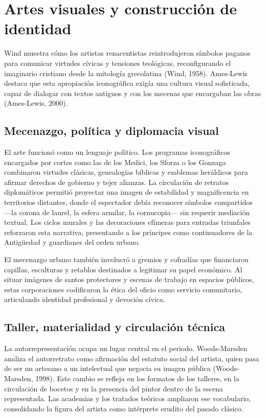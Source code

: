 \chapter{Artes visuales y construcción de identidad}
Wind muestra cómo los artistas renacentistas reintrodujeron símbolos paganos para comunicar virtudes cívicas y tensiones teológicas, reconfigurando el imaginario cristiano desde la mitología grecolatina (Wind, 1958). Ames-Lewis destaca que esta apropiación iconográfica exigía una cultura visual sofisticada, capaz de dialogar con textos antiguos y con los mecenas que encargaban las obras (Ames-Lewis, 2000).

\section{Mecenazgo, política y diplomacia visual}
El arte funcionó como un lenguaje político. Los programas iconográficos encargados por cortes como las de los Medici, los Sforza o los Gonzaga combinaron virtudes clásicas, genealogías bíblicas y emblemas heráldicos para afirmar derechos de gobierno y tejer alianzas. La circulación de retratos diplomáticos permitió proyectar una imagen de estabilidad y magnificencia en territorios distantes, donde el espectador debía reconocer símbolos compartidos —la corona de laurel, la esfera armilar, la cornucopia— sin requerir mediación textual. Los ciclos murales y las decoraciones efímeras para entradas triunfales reforzaron esta narrativa, presentando a los príncipes como continuadores de la Antigüedad y guardianes del orden urbano.

El mecenazgo urbano también involucró a gremios y cofradías que financiaron capillas, esculturas y retablos destinados a legitimar su papel económico. Al situar imágenes de santos protectores y escenas de trabajo en espacios públicos, estas corporaciones codificaron la ética del oficio como servicio comunitario, articulando identidad profesional y devoción cívica.

\section{Taller, materialidad y circulación técnica}
La autorrepresentación ocupa un lugar central en el periodo. Woods-Marsden analiza el autorretrato como afirmación del estatuto social del artista, quien pasa de ser un artesano a un intelectual que negocia su imagen pública (Woods-Marsden, 1998). Este cambio se refleja en los formatos de los talleres, en la circulación de bocetos y en la presencia del pintor dentro de la escena representada. Las academias y los tratados teóricos ampliaron ese vocabulario, consolidando la figura del artista como intérprete erudito del pasado clásico.

